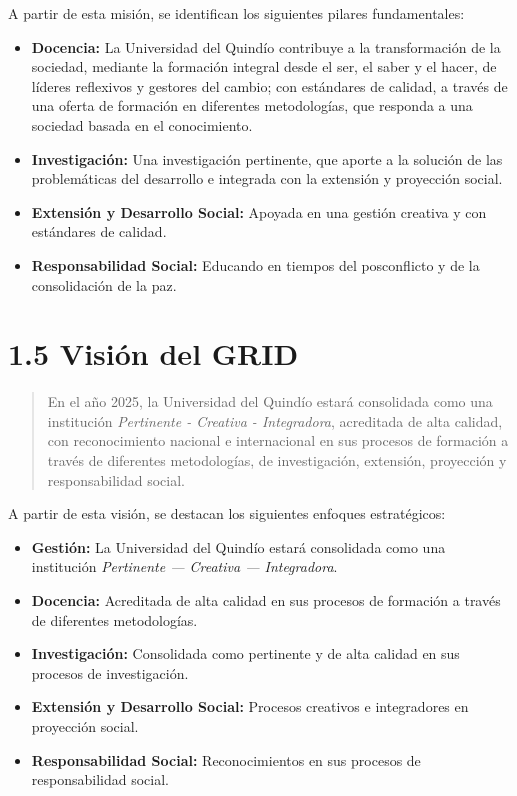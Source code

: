 A partir de esta misión, se identifican los siguientes pilares fundamentales:

\begin{itemize}
    \item \textbf{Docencia:} La Universidad del Quindío contribuye a la transformación de la sociedad, mediante la formación integral desde el ser, el saber y el hacer, de líderes reflexivos y gestores del cambio; con estándares de calidad, a través de una oferta de formación en diferentes metodologías, que responda a una sociedad basada en el conocimiento.

    \item \textbf{Investigación:} Una investigación pertinente, que aporte a la solución de las problemáticas del desarrollo e integrada con la extensión y proyección social.

    \item \textbf{Extensión y Desarrollo Social:} Apoyada en una gestión creativa y con estándares de calidad.

    \item \textbf{Responsabilidad Social:} Educando en tiempos del posconflicto y de la consolidación de la paz.
\end{itemize}

\section*{1.5 Visión del GRID}

\begin{quote}
En el año 2025, la Universidad del Quindío estará consolidada como una institución \textit{Pertinente - Creativa - Integradora}, acreditada de alta calidad, con reconocimiento nacional e internacional en sus procesos de formación a través de diferentes metodologías, de investigación, extensión, proyección y responsabilidad social.
\end{quote}

A partir de esta visión, se destacan los siguientes enfoques estratégicos:

\begin{itemize}
    \item \textbf{Gestión:} La Universidad del Quindío estará consolidada como una institución \textit{Pertinente --- Creativa --- Integradora}.

    \item \textbf{Docencia:} Acreditada de alta calidad en sus procesos de formación a través de diferentes metodologías.

    \item \textbf{Investigación:} Consolidada como pertinente y de alta calidad en sus procesos de investigación.

    \item \textbf{Extensión y Desarrollo Social:} Procesos creativos e integradores en proyección social.

    \item \textbf{Responsabilidad Social:} Reconocimientos en sus procesos de responsabilidad social.
\end{itemize}

